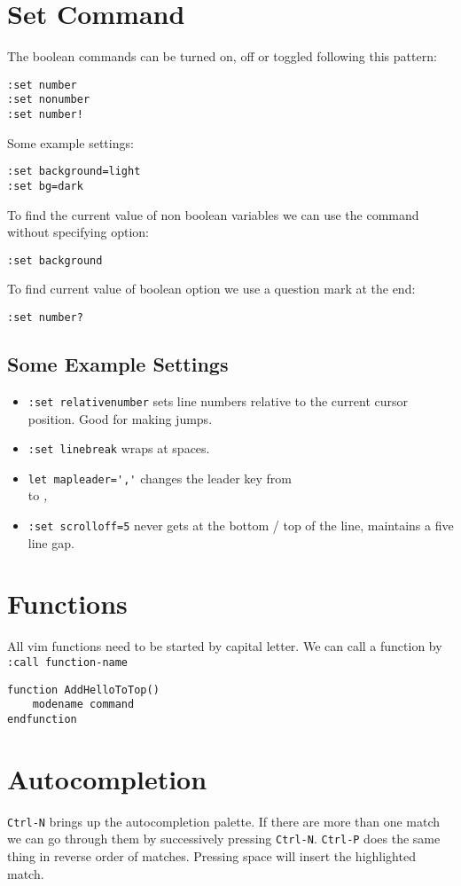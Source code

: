 \documentclass[a4paper, 12pt]{article}
\begin{document}
\section{Set Command}
The boolean commands can be turned on, off or toggled following this pattern:
\begin{verbatim}
:set number
:set nonumber
:set number!
\end{verbatim}
Some example settings:
\begin{verbatim}
:set background=light
:set bg=dark
\end{verbatim}
To find the current value of non boolean variables we can use the command without specifying option:
\begin{verbatim}
:set background
\end{verbatim}
To find current value of boolean option we use a question mark at the end:
\begin{verbatim}
:set number?
\end{verbatim}
\subsection{Some Example Settings}
\begin{itemize}
	\item \verb|:set relativenumber| sets line numbers relative to the current cursor position. Good for making jumps.	
	\item \verb|:set linebreak| wraps at spaces.
	\item \verb|let mapleader=','| changes the leader key from \emph{\\} to \emph{,}
	\item \verb|:set scrolloff=5| never gets at the bottom / top of the line, maintains a five line gap.
\end{itemize}

\section{Functions}
All vim functions need to be started by capital letter.
We can call a function by \verb|:call function-name|
\begin{verbatim}
function AddHelloToTop()
	modename command
endfunction
\end{verbatim}

\section{Autocompletion}
\verb|Ctrl-N| brings up the autocompletion palette. If there are more than one match we can go through them by successively pressing \verb|Ctrl-N|. \verb|Ctrl-P| does the same thing in reverse order of matches. Pressing space will insert the highlighted match.
\end{document}
